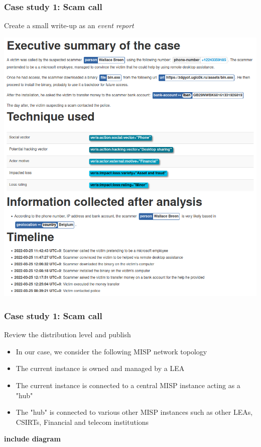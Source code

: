 \begin{frame}
    \frametitle{Case study 1: Scam call}
    Create a small write-up as an \textit{event report}
    \begin{center}
        \includegraphics[width=0.65\linewidth]{pictures/case1/event-report.png}
    \end{center}
\end{frame}

\begin{frame}
    \frametitle{Case study 1: Scam call}
    Review the distribution level and publish
    \begin{itemize}
        \item In our case, we consider the following MISP network topology
        \item The current instance is owned and managed by a LEA
        \item The current instance is connected to a central MISP instance acting as a "hub"
        \item The "hub" is connected to various other MISP instances such as other LEAs, CSIRTs, Financial and telecom institutions
    \end{itemize}
    \textbf{include diagram}
\end{frame}

